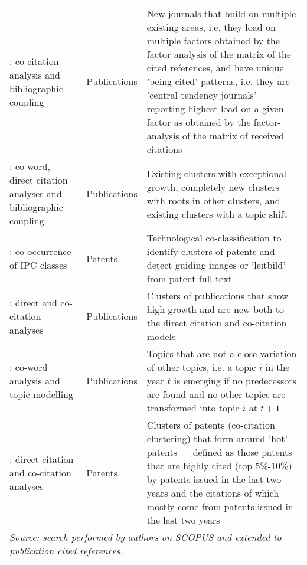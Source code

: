 \documentclass[11pt]{article}
\begin{document}
{\begin{landscape}
\begin{spacing}{0.8}
\begin{longtable}{p{6cm}p{2.7cm}p{13cm}}
\addtolength{\leftskip}{1em}\noindent		\cite{Leydesdorff1994}: co-citation analysis and bibliographic coupling& 	Publications&		New journals that build on multiple existing areas, i.e. they load on multiple factors obtained by the factor analysis of the matrix of the cited references, and have unique 'being cited' patterns, i.e. they are 'central tendency journals' reporting highest load on a given factor as obtained by the factor-analysis of the matrix of received citations\\[1ex]

\addtolength{\leftskip}{1em}\noindent		\cite{Glanzel2012}: co-word, direct citation analyses and bibliographic coupling&  	Publications&  		Existing clusters with exceptional growth, completely new clusters with roots in other clusters, and existing clusters with a topic shift\\[1ex]

\addtolength{\leftskip}{1em}\noindent		 \cite{Gustafsson2015}: co-occurrence of IPC classes& Patents&		Technological co-classification to identify clusters of patents and detect guiding images or 'leitbild' from patent full-text\\[1ex]

\addtolength{\leftskip}{1em}\noindent		 \cite{Small2014}: direct and co-citation analyses&  		Publications&  		Clusters of publications that show high growth and are new both to the direct citation and co-citation models \\[1ex]

\addtolength{\leftskip}{1em}\noindent		\cite{Yan2014}: co-word analysis and topic modelling &  		Publications&  		Topics that are not a close variation of other topics, i.e. a topic $i$ in the year $t$ is emerging if no predecessors are found and no other topics are transformed into topic $i$ at $t+1$\\[1ex]

\addtolength{\leftskip}{1em}\noindent		\cite{Chang2009,Breitzman2015}: direct citation and co-citation analyses &  		Patents&  		Clusters of patents (co-citation clustering) that form around 'hot' patents --- defined as those patents that are highly cited (top 5\%-10\%) by patents issued in the last two years and the citations of which mostly come from patents issued in the last two years\\[1ex]

\hline\hline
\multicolumn{3}{l}{\footnotesize \textit{Source: search performed by authors on SCOPUS and extended to publication cited references.}}

\end{longtable}
\end{spacing}
\end{landscape}
}
\end{document}
